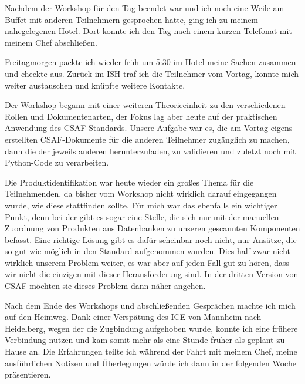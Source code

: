 Nachdem der Workshop für den Tag beendet war und ich noch eine Weile am Buffet mit anderen Teilnehmern gesprochen hatte, ging ich zu meinem nahegelegenen Hotel.
Dort konnte ich den Tag nach einem kurzen Telefonat mit meinem Chef abschließen.

\sweekdaymarginpar{\weekdayFridayLong}

Freitagmorgen packte ich wieder früh um 5:30 im Hotel meine Sachen zusammen und checkte aus.
Zurück im ISH traf ich die Teilnehmer vom Vortag, konnte mich weiter austauschen und knüpfte weitere Kontakte.

Der Workshop begann mit einer weiteren Theorieeinheit zu den verschiedenen Rollen und Dokumentenarten, der Fokus lag aber heute auf der praktischen Anwendung des CSAF-Standards.
Unsere Aufgabe war es, die am Vortag eigens erstellten CSAF-Dokumente für die anderen Teilnehmer zugänglich zu machen, dann die der jeweils anderen herunterzuladen, zu validieren und zuletzt noch mit Python-Code zu verarbeiten.

Die Produktidentifikation war heute wieder ein großes Thema für die Teilnehmenden, da bisher vom Workshop nicht wirklich darauf eingegangen wurde, wie diese stattfinden sollte.
Für mich war das ebenfalls ein wichtiger Punkt, denn bei der \metaeffekt gibt es sogar eine Stelle, die sich nur mit der manuellen Zuordnung von Produkten aus Datenbanken zu unseren gescannten Komponenten befasst.
Eine richtige Lösung gibt es dafür scheinbar noch nicht, nur Ansätze, die so gut wie möglich in den Standard aufgenommen wurden.
Dies half zwar nicht wirklich unserem Problem weiter, es war aber auf jeden Fall gut zu hören, dass wir nicht die einzigen mit dieser Herausforderung sind.
In der dritten Version von CSAF möchten sie dieses Problem dann näher angehen.

Nach dem Ende des Workshops und abschließenden Gesprächen machte ich mich auf den Heimweg.
Dank einer Verspätung des ICE von Mannheim nach Heidelberg, wegen der die Zugbindung aufgehoben wurde, konnte ich eine frühere Verbindung nutzen und kam somit mehr als eine Stunde früher als geplant zu Hause an.
Die Erfahrungen teilte ich während der Fahrt mit meinem Chef, meine ausführlichen Notizen und Überlegungen würde ich dann in der folgenden Woche präsentieren.
